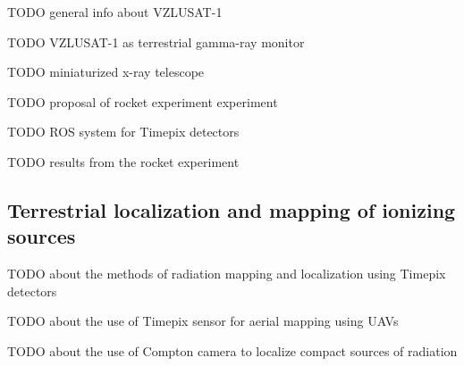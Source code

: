 \documentclass[a4paper,11pt,titlepage,twoside]{book}
\newcommand{\todo}[1]{{\color{red} TODO {#1}}}
\begin{document}
\todo{general info about VZLUSAT-1}
\cite{urban2017vzlusat} %
\cite{daniel2019inorbit} %

\todo{VZLUSAT-1 as terrestrial gamma-ray monitor}
\cite{daniel2016terrestrial}

\todo{miniaturized x-ray telescope}
\cite{baca2016miniaturized}
\cite{baca2018timepix} %

\todo{proposal of rocket experiment experiment}
\cite{daniel2017xray}

\todo{ROS system for Timepix detectors}
\cite{baca2018rospix}

\todo{results from the rocket experiment}
\cite{urban2020rex}

\subsection{Terrestrial localization and mapping of ionizing sources}

\todo{about the methods of radiation mapping and localization using Timepix detectors}
\cite{baca2019timepix}

\todo{about the use of Timepix sensor for aerial mapping using UAVs}
\cite{stibinger2020localization}

\todo{about the use of Compton camera to localize compact sources of radiation}
\cite{baca2020gamma}

\end{document}
